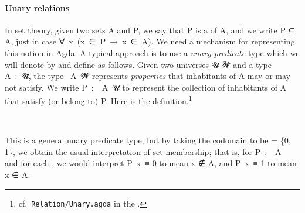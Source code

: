 \paragraph*{Unary relations}

In set theory, given two sets \ab A and \ab P, we say that \ab P is a  of \ab A, and we write \ab P \af ⊆ \ab A, just in case \as ∀~\ab x~(\ab x~\af ∈~\ab P~\as →~\ab x~\af ∈~\ab A). We need a mechanism for representing this notion in Agda. A typical approach is to use a \emph{unary predicate} type which we will denote by  and define as follows.  Given two universes \ab 𝓤 \ab 𝓦 and a type \ab A~\as :~\ab 𝓤\af ̇, the type ~\ab A~\ab 𝓦 represents \emph{properties} that inhabitants of \ab A may or may not satisfy.  We write \ab P~\as :~~\ab A~\ab 𝓤 to represent the %
collection of inhabitants of \ab A that satisfy (or belong to) \ab P. Here is the definition.\footnote{\label{relunary}cf.~\texttt{Relation/Unary.agda} in the \agdastdlib.}
\ccpad
\begin{code}%
\>[0]\AgdaSpace{}%
\AgdaSymbol{:}\AgdaSpace{}%
\AgdaSpace{}%
\AgdaSpace{}%
\AgdaSpace{}%
\AgdaSymbol{(}\AgdaSpace{}%
\AgdaSymbol{:}\AgdaSpace{}%
\AgdaSymbol{)}\AgdaSpace{}%
\AgdaSpace{}%
\AgdaSpace{}%
\AgdaSpace{}%
\AgdaSpace{}%
\AgdaSpace{}%
\<%
\\
\>[0]\AgdaSpace{}%
\AgdaSpace{}%
\AgdaSpace{}%
\AgdaSymbol{=}\AgdaSpace{}%
\AgdaSpace{}%
\AgdaSpace{}%
\AgdaSpace{}%
\<%
\end{code}
\ccpad
This is a general unary predicate type, but by taking the codomain to be  = \{0, 1\}, we obtain the usual interpretation of set membership; that is,
for \ab P~\as :~~\ab A~ and for each , we would interpret \ab P~\ab x~\ad ≡ 0 to mean \ab x ∉ \ab A, and \ab P~\ab x~\ad ≡ 1 to mean \ab x ∈ \ab A.


